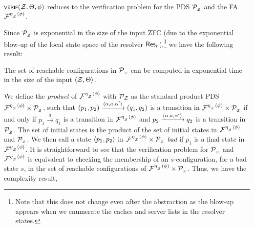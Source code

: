 \begin{lemma}
	$\scrsf{verif}(\cal Z, \Theta,  \phi)$ reduces to the verification problem for the PDS $\cal P\subsub{\cal Z}$ and the FA $\cal F^{\synhomZ(\phi)}$.
\end{lemma}

 Since $\cal P\subsub{\cal Z}$ is exponential in the size of the input ZFC (due to the exponential blow-up of the local state space of the resolver $\rec{r}$),\footnote{Note that this does not change even after the abstraction as the blow-up appears when we enumerate the caches and server lists in the resolver states.} we have the following result:

\begin{lemma}
    The set of reachable configurations in $\cal P\subsub{\cal Z}$ can be computed in exponential time in the size of the input $\tup{\cal Z, \Theta}$.
\end{lemma}


We define the \emph{product} of $\cal F^{\synhomZ(\phi)}$ with $\cal P_{\cal Z}$ as the standard product PDS $\cal F^{\synhomZ(\phi)} \times \cal P\subsub{\cal Z}$, such that $(p_1,p_2) \xrightarrow{\tup{\alpha, a, \alpha'}} (q_1,q_2)$ is a transition in $\cal F^{\synhomZ(\phi)} \times \cal P\subsub{\cal Z}$ if and only if $p_1 \xrightarrow{a} q_1$ is a transition in $\cal F^{\synhomZ(\phi)}$ and $p_2 \xrightarrow{\tup{\alpha, a, \alpha'}} q_2$ is a transition in $\cal P\subsub{\cal Z}$. The set of initial states is the product of the set of initial states in $\cal F^{\synhomZ(\phi)}$ and $\cal P\subsub{\cal Z}$. We then call a state $\tup{p_1,p_2}$ in $\cal F^{\synhomZ(\phi)} \times \cal P\subsub{\cal Z}$ \emph{bad} if $p_1$ is a final state in $\cal F^{\synhomZ(\phi)}$. It is straightforward to see that the verification problem for $\cal P\subsub{\cal Z}$ and $\cal F^{\synhomZ(\phi)}$ is equivalent to checking the membership of an $s$-configuration, for a bad state $s$, in the set of reachable configurations of $\cal F^{\synhomZ(\phi)} \times \cal P\subsub{\cal Z}$. Thus, we have the complexity result,

\begin{lemma}\label{lem:complexity}
\end{lemma}

